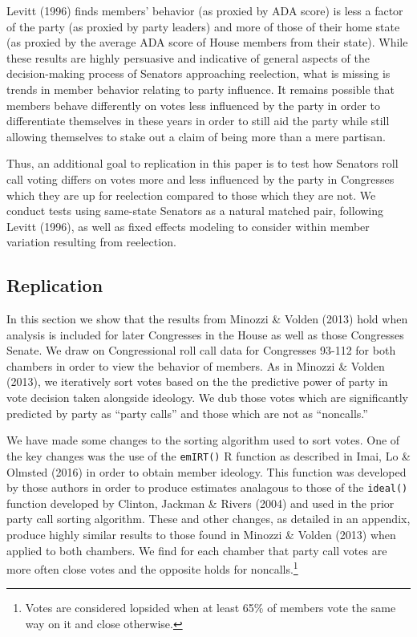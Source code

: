 \documentclass[12pt]{article}
\begin{document}
Levitt (1996) finds members' behavior (as proxied by ADA score) is less a factor of the party (as proxied by party leaders) and more of those of their home state (as proxied by the average ADA score of House members from their state). While these results are highly persuasive and indicative of general aspects of the decision-making process of Senators approaching reelection, what is missing is trends in member behavior relating to party influence. It remains possible that members behave differently on votes less influenced by the party in order to differentiate themselves in these years in order to still aid the party while still allowing themselves to stake out a claim of being more than a mere partisan.

Thus, an additional goal to replication in this paper is to test how Senators roll call voting differs on votes more and less influenced by the party in Congresses which they are up for reelection compared to those which they are not. We conduct tests using same-state Senators as a natural matched pair, following Levitt (1996), as well as fixed effects modeling to consider within member variation resulting from reelection.


\subsection{Replication}

In this section we show that the results from Minozzi \& Volden (2013) hold when analysis is included for later Congresses in the House as well as those Congresses Senate. We draw on Congressional roll call data for Congresses 93-112 for both chambers in order to view the behavior of members. As in Minozzi \& Volden (2013), we iteratively sort votes based on the the predictive power of party in vote decision taken alongside ideology. We dub those votes which are significantly predicted by party as ``party calls'' and those which are not as ``noncalls.'' 

We have made some changes to the sorting algorithm used to sort votes. One of the key changes was the use of the \verb|emIRT()| R function as described in Imai, Lo \& Olmsted (2016) in order to obtain member ideology. This function was developed by those authors in order to produce estimates analagous to those of the \verb|ideal()| function developed by Clinton, Jackman \& Rivers (2004) and used in the prior party call sorting algorithm. These and other changes, as detailed in an appendix, produce highly similar results to those found in Minozzi \& Volden (2013) when applied to both chambers. We find for each chamber that party call votes are more often close votes and the opposite holds for noncalls.\footnote{Votes are considered lopsided when at least 65\% of members vote the same way on it and close otherwise.}
\end{document}
